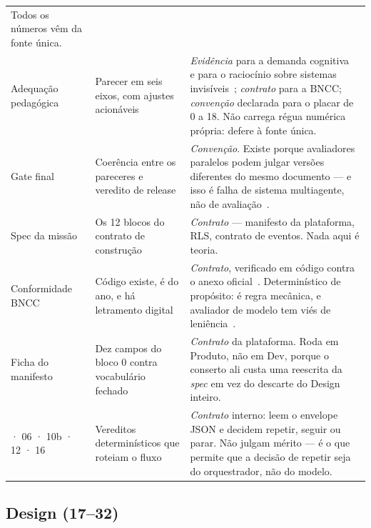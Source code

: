\documentclass[11pt,a4paper]{article}
\begin{document}
\begin{center}
\begin{longtable}{p{2.5cm}p{5.4cm}p{6.6cm}}
Todos os números vêm da fonte única. \\
\addlinespace
10 Adequação pedagógica & Parecer em seis eixos, com ajustes acionáveis &
\textit{Evidência} para a demanda cognitiva~\cite{biggs1982} e para o raciocínio sobre sistemas
invisíveis~\cite{osterhaus2021,starks2024}; \textit{contrato} para a BNCC; \textit{convenção}
declarada para o placar de 0 a 18. Não carrega régua numérica própria: defere à fonte única. \\
\addlinespace
11 Gate final & Coerência entre os pareceres e veredito de release &
\textit{Convenção}. Existe porque avaliadores paralelos podem julgar versões diferentes do mesmo
documento --- e isso é falha de sistema multiagente, não de avaliação~\cite{cemri2025b}. \\
\addlinespace
13 Spec da missão & Os 12 blocos do contrato de construção &
\textit{Contrato} --- manifesto da plataforma, RLS, contrato de eventos. Nada aqui é teoria. \\
\addlinespace
14 Conformidade BNCC & Código existe, é do ano, e há letramento digital &
\textit{Contrato}, verificado em código contra o anexo oficial~\cite{cne2022b}. Determinístico de
propósito: é regra mecânica, e avaliador de modelo tem viés de leniência~\cite{zheng2023b}. \\
\addlinespace
15 Ficha do manifesto & Dez campos do bloco 0 contra vocabulário fechado &
\textit{Contrato} da plataforma. Roda em Produto, não em Dev, porque o conserto ali custa uma
reescrita da \emph{spec} em vez do descarte do Design inteiro. \\
\addlinespace
03 · 06 · 10b · 12 · 16 & Vereditos determinísticos que roteiam o fluxo &
\textit{Contrato} interno: leem o envelope JSON e decidem repetir, seguir ou parar. Não julgam
mérito --- é o que permite que a decisão de repetir seja do orquestrador, não do modelo. \\
\bottomrule
\end{longtable}
\end{center}

\subsection{Design (17--32)}
\end{document}

